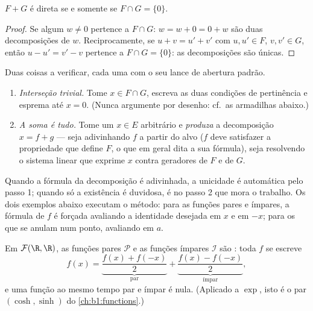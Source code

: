 \begin{proposition}\label{prop:b1:vspaces:directsum}
$F + G$ é direta se e somente se $F \cap G = \{0\}$.
\end{proposition}

\begin{proof}
Se algum $w \neq 0$ pertence a $F \cap G$: $w = w + 0 = 0 + w$ são duas
decomposições de $w$. Reciprocamente, se $u + v = u' + v'$ com $u, u'
\in F$, $v, v' \in G$,
então $u - u' = v' - v$ pertence a $F \cap G =
\{0\}$: as decomposições são únicas.
\end{proof}

\begin{method}[Demonstrar que $E = F \oplus G$]
\label{met:b1:vspaces:directsum}
Duas coisas a verificar, cada uma com o seu lance de abertura padrão.
\begin{enumerate}
  \item \emph{Interseção trivial.} Tome $x \in F \cap G$,
        escreva as duas condições de pertinência e esprema até
        $x =
        0$. (Nunca argumente por desenho: cf.\ as armadilhas
        abaixo.)
  \item \emph{A soma é tudo.} Tome um $x \in E$ arbitrário
        e \emph{produza} a decomposição $x = f + g$ ---
        seja adivinhando $f$ a partir do alvo ($f$ deve satisfazer
        a propriedade que define $F$, o que em geral dita a sua
        fórmula), seja resolvendo o sistema linear que exprime $x$
        contra geradores de $F$ e de $G$.
\end{enumerate}
Quando a fórmula da decomposição é adivinhada, a unicidade é
automática pelo passo 1; quando só a existência é duvidosa, é no
passo 2 que mora o trabalho. Os dois exemplos abaixo executam o
método: para as funções pares e ímpares, a fórmula de $f$ é forçada
avaliando a identidade desejada em $x$ e em $-x$; para os 
que se anulam num ponto, avaliando em $a$.
\end{method}

\begin{example}\label{ex:b1:vspaces:evenodd}
Em $\mathcal{F}(\R, \R)$, as funções pares $\mathcal{P}$ e as funções ímpares $\mathcal{I}$ são
: toda $f$ se escreve
\[
f(x) = \underbrace{\frac{f(x) + f(-x)}{2}}_{\text{par}}
+ \underbrace{\frac{f(x) - f(-x)}{2}}_{\text{ímpar}},
\]
e uma função ao mesmo tempo par e ímpar é nula. (Aplicado a $\exp$,
isto é o par $(\cosh, \sinh)$ do \cref{ch:b1:functions}.)
\end{example}

